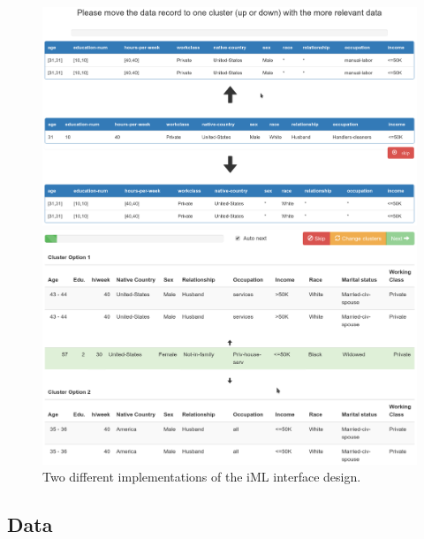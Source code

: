 \documentclass{llncs}
\begin{document}
\begin{figure}[!h]
	\begin{center}
		\vspace{-1.0cm}
		\hspace*{-0.8cm}
		\includegraphics[width=1.0\textwidth]{figures/iml_anon_screen1}
		
		\vspace{1.0cm}
		\hspace*{-0.8cm}
		\includegraphics[width=1.0\textwidth]{figures/iml_anon_screen2}
		\caption{Two different implementations of the iML interface design.}
		\label{fig:iml_UI}
	\end{center}
\end{figure}


\subsection{Data} 
\label{ssect:data}
\end{document}
